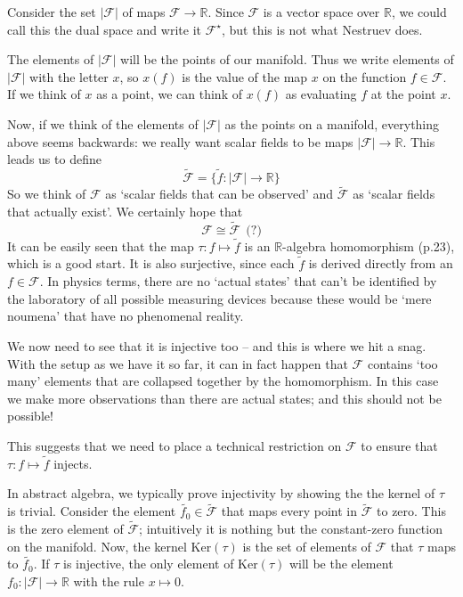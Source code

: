 \documentclass[oneside,english]{amsbook}
\numberwithin{section}{chapter}
\theoremstyle{plain}
\theoremstyle{definition}
\begin{document}
Consider the set $|\mathscr{F}|$ of maps  $\mathscr{F}\to\mathbb{R}$. Since  $\mathscr{F}$ is a vector space over $\mathbb{R}$, we could call this the dual space and write it $\mathscr{F}^\star$, but this is not what Nestruev does.

The elements of $|\mathscr{F}|$ will be the points of our manifold. Thus we write elements of $|\mathscr{F}|$ with the letter $x$, so $x(f)$ is the value of the map $x$ on the function $f\in\mathscr{F}$. If we think of $x$ as a point, we can think of $x(f)$ as evaluating $f$ at the point $x$.

Now, if we think of the elements of $|\mathscr{F}|$ as the points on a manifold, everything above seems backwards: we really want scalar fields to be maps $|\mathscr{F}|\to\mathbb{R}$. This leads us to define 
\[
	\tilde{\mathscr{F}} = \{\tilde{f}:|\mathscr{F}|\to\mathbb{R}\}
\]
So we think of $\mathscr{F}$ as `scalar fields that can be observed' and $\tilde{\mathscr{F}}$ as `scalar fields that actually exist'. We certainly hope that
\[
	\mathscr{F}\cong \tilde{\mathscr{F}}\ \ \text{(?)}
\]
It can be easily seen that the map $\tau:f\mapsto\tilde{f}$ is an $\mathbb{R}$-algebra homomorphism (p.23), which is a good start. It is also surjective, since each $\tilde{f}$ is derived directly from an $f\in\mathscr{F}$. In physics terms, there are no `actual states' that can't be identified by the laboratory of all possible measuring devices because these would be `mere noumena' that have no phenomenal reality.

We now need to see that it is injective too -- and this is where we hit a snag. With the setup as we have it so far, it can in fact happen that $\mathscr{F}$ contains `too many' elements that are collapsed together by the homomorphism. In this case we make more observations than there are actual states; and this should not be possible!

This suggests that we need to place a technical restriction on $\mathscr{F}$ to ensure that $\tau:f\mapsto\tilde{f}$ injects.

In abstract algebra, we typically prove injectivity by showing the the kernel of $\tau$ is trivial. Consider the element $\tilde{f_0}\in\tilde{\mathscr{F}}$ that maps every point in $\tilde{\mathscr{F}}$ to zero. This is the zero element of $\tilde{\mathscr{F}}$; intuitively it is nothing but the constant-zero function on the manifold. Now, the kernel $\text{Ker}(\tau)$ is the set of elements of $\mathscr{F}$ that $\tau$ maps to $\tilde{f_0}$. If $\tau$ is injective, the only element of $\text{Ker}(\tau)$ will be the element $f_0:|\mathscr{F}|\to\mathbb{R}$ with the rule $x\mapsto 0$. 
\end{document}
